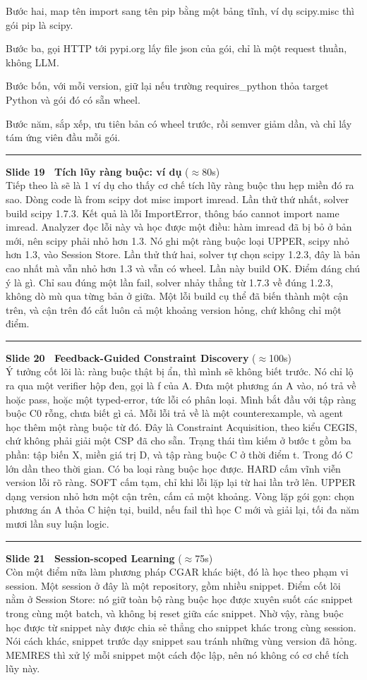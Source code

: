 \documentclass[11pt]{article}
\newcommand{\slidehead}[3]{%
  \vspace{1.05em}\par\noindent
  {\color{accent}\rule[-0.18em]{3pt}{1.05em}}\hspace{0.5em}%
  {\bfseries\large\color{navydeep}Slide #1 \textperiodcentered\ #2}%
  \hfill{\small\color{gray}(#3)}\\[0.25em]%
}
\begin{document}
Bước hai, map tên import sang tên pip bằng một bảng tĩnh, ví dụ scipy.misc thì gói pip là scipy.

Bước ba, gọi HTTP tới pypi.org lấy file json của gói, chỉ là một request thuần, không LLM.

Bước bốn, với mỗi version, giữ lại nếu trường requires\_python thỏa target Python và gói đó có sẵn wheel.

Bước năm, sắp xếp, ưu tiên bản có wheel trước, rồi semver giảm dần, và chỉ lấy tám ứng viên đầu mỗi gói.

\slidehead{19}{Tích lũy ràng buộc: ví dụ}{$\approx$80s}
Tiếp theo là sẽ là 1 ví dụ cho thấy cơ chế tích lũy ràng buộc thu hẹp miền đó ra sao. Dòng code là from scipy dot misc import imread. Lần thử thứ nhất, solver build scipy 1.7.3. Kết quả là lỗi ImportError, thông báo cannot import name imread. Analyzer đọc lỗi này và học được một điều: hàm imread đã bị bỏ ở bản mới, nên scipy phải nhỏ hơn 1.3. Nó ghi một ràng buộc loại UPPER, scipy nhỏ hơn 1.3, vào Session Store. Lần thử thứ hai, solver tự chọn scipy 1.2.3, đây là bản cao nhất mà vẫn nhỏ hơn 1.3 và vẫn có wheel. Lần này build OK. Điểm đáng chú ý là gì. Chỉ sau đúng một lần fail, solver nhảy thẳng từ 1.7.3 về đúng 1.2.3, không dò mù qua từng bản ở giữa. Một lỗi build cụ thể đã biến thành một cận trên, và cận trên đó cắt luôn cả một khoảng version hỏng, chứ không chỉ một điểm.

\slidehead{20}{Feedback-Guided Constraint Discovery}{$\approx$100s}
Ý tưởng cốt lõi là: ràng buộc thật bị ẩn, thì mình sẽ không biết trước. Nó chỉ lộ ra qua một verifier hộp đen, gọi là f của A. Đưa một phương án A vào, nó trả về hoặc pass, hoặc một typed-error, tức lỗi có phân loại. Mình bắt đầu với tập ràng buộc C0 rỗng, chưa biết gì cả. Mỗi lỗi trả về là một counterexample, và agent học thêm một ràng buộc từ đó. Đây là Constraint Acquisition, theo kiểu CEGIS, chứ không phải giải một CSP đã cho sẵn. Trạng thái tìm kiếm ở bước t gồm ba phần: tập biến X, miền giá trị D, và tập ràng buộc C ở thời điểm t. Trong đó C lớn dần theo thời gian. Có ba loại ràng buộc học được. HARD cấm vĩnh viễn version lỗi rõ ràng. SOFT cấm tạm, chỉ khi lỗi lặp lại từ hai lần trở lên. UPPER dạng version nhỏ hơn một cận trên, cấm cả một khoảng. Vòng lặp gói gọn: chọn phương án A thỏa C hiện tại, build, nếu fail thì học C mới và giải lại, tối đa năm mươi lần suy luận logic.

\slidehead{21}{Session-scoped Learning}{$\approx$75s}
Còn một điểm nữa làm phương pháp CGAR khác biệt, đó là học theo phạm vi session. Một session ở đây là một repository, gồm nhiều snippet. Điểm cốt lõi nằm ở Session Store: nó giữ toàn bộ ràng buộc học được xuyên suốt các snippet trong cùng một batch, và không bị reset giữa các snippet. Nhờ vậy, ràng buộc học được từ snippet này được chia sẻ thẳng cho snippet khác trong cùng session. Nói cách khác, snippet trước dạy snippet sau tránh những vùng version đã hỏng. MEMRES thì xử lý mỗi snippet một cách độc lập, nên nó không có cơ chế tích lũy này.
\end{document}
